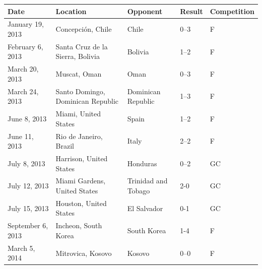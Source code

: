 \documentclass{article}
\begin{document}
\begin{tabular}{lllll}
\toprule
Date & Location & Opponent & Result & Competition \\
\midrule
January 19, 2013 & Concepción, Chile & Chile & 0–3 & F \\
February 6, 2013 & Santa Cruz de la Sierra, Bolivia & Bolivia & 1–2 & F \\
March 20, 2013 & Muscat, Oman & Oman & 0–3 & F \\
March 24, 2013 & Santo Domingo, Dominican Republic & Dominican Republic & 1–3 & F \\
June 8, 2013 & Miami, United States & Spain & 1–2 & F \\
June 11, 2013 & Rio de Janeiro, Brazil & Italy & 2–2 & F \\
July 8, 2013 & Harrison, United States & Honduras & 0–2 & GC \\
July 12, 2013 & Miami Gardens, United States & Trinidad and Tobago & 2-0 & GC \\
July 15, 2013 & Houston, United States & El Salvador & 0-1 & GC \\
September 6, 2013 & Incheon, South Korea & South Korea & 1-4 & F \\
March 5, 2014 & Mitrovica, Kosovo & Kosovo & 0–0 & F \\
\bottomrule
\end{tabular}
\end{document}
